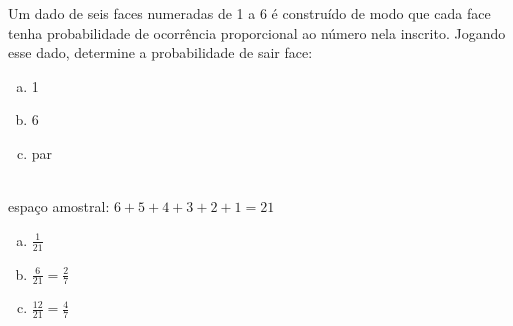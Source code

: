 \begin{ex}
Um dado de seis faces numeradas de 1 a 6 é construído de modo que cada face tenha probabilidade de ocorrência proporcional ao número nela inscrito. Jogando esse dado, determine a probabilidade de sair face:
   \begin{enumerate}[(a)]
   \item 1
   \item 6
   \item par
   \end{enumerate}
     \begin{sol}
       \phantom{A} \\
       espaço amostral: $6+5+4+3+2+1=21$
         \begin{enumerate} [(a)]
             \item $\frac{1}{21}$
             \item $\frac{6}{21}=\frac{2}{7}$
             \item $\frac{12}{21}=\frac{4}{7}$
         \end{enumerate}
     \end{sol}
\end{ex}